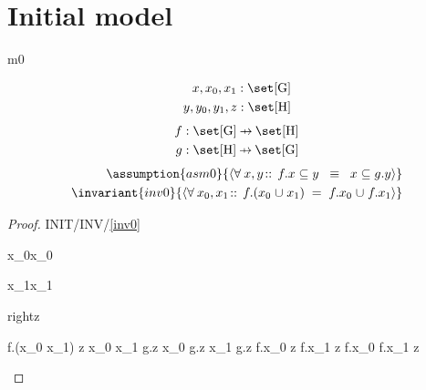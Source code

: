 \documentclass[12pt]{amsart}
\title{}
\author{}
\date{} %
\begin{document}
\maketitle
\tableofcontents

\newcommand{\G}{\text{G}}
\renewcommand{\H}{\text{H}}

\section{Initial model}
\begin{machine}{m0}

\newset{G}{\G}
\newset{H}{\H}


\begin{align*}
\dummy{x, x_0, x_1 : \set[\G]} \\
\dummy{y,y_0,y_1, z: \set[\H]}
\end{align*}
\begin{align*}
\constant{f : \set [\G] \pfun \set [\H]} \\
\constant{g : \set [\H] \pfun \set [\G]} \\
\end{align*}
\begin{align*}
\assumption{asm0}{ \qforall{x,y}{}{ f.x \subseteq y \2\equiv x \subseteq g.y } } \\
\invariant{inv0}{ \qforall{x_0,x_1}{}{ f.(x_0 \bunion x_1) \1 = f.x_0 \bunion f.x_1 } }
\end{align*}

\begin{proof}{INIT/INV/\ref{inv0}}
	\begin{free:var}{x_0}{x_0}
	\begin{free:var}{x_1}{x_1}
	\begin{indirect:equality}{right}{\subseteq}{z}
	\begin{calculation}
		f.(x_0 \bunion x_1) \1\subseteq z
	\hint{=}{ \eqref{asm0} }
		x_0 \bunion x_1 \1\subseteq g.z
		x_0 \subseteq g.z \2\land x_1 \subseteq g.z
	\hint{=}{ \eqref{asm0} }
		f.x_0 \subseteq z \2\land f.x_1 \subseteq z
		f.x_0 \bunion f.x_1 \1\subseteq z
	\end{calculation}
	\end{indirect:equality}
	\end{free:var}
	\end{free:var}
\end{proof}


\end{machine}
\end{document}
